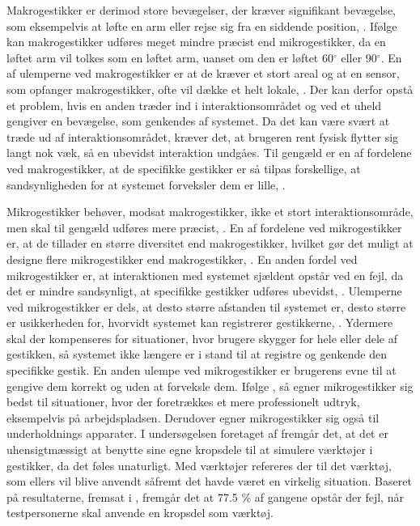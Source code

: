 Makrogestikker er derimod store bevægelser, der kræver signifikant bevægelse, som eksempelvis at løfte en arm eller rejse sig fra en siddende position, \parencite[s. 6]{PDF:UsabilityofMicroVsMacroGestures}. Ifølge \textcite[s. 9]{PDF:UsabilityofMicroVsMacroGestures} kan makrogestikker udføres meget mindre præcist end mikrogestikker, da en løftet arm vil tolkes som en løftet arm, uanset om den er løftet 60$^{\circ}$ eller 90$^{\circ}$. En af ulemperne ved makrogestikker er at de kræver et stort areal og at en sensor, som opfanger makrogestikker, ofte vil dække et helt lokale, \parencite[s. 9]{PDF:UsabilityofMicroVsMacroGestures}. Der kan derfor opstå et problem, hvis en anden træder ind i interaktionsområdet og ved et uheld gengiver en bevægelse, som genkendes af systemet. Da det kan være svært at træde ud af interaktionsområdet, kræver det, at brugeren rent fysisk flytter sig langt nok væk, så en ubevidst interaktion undgåes. Til gengæld er en af fordelene ved makrogestikker, at de specifikke gestikker er så tilpas forskellige, at sandsynligheden for at systemet forveksler dem er lille, \parencite[s. 9]{PDF:UsabilityofMicroVsMacroGestures}.  

Mikrogestikker behøver, modsat makrogestikker, ikke et stort interaktionsområde, men skal til gengæld udføres mere præcist, \parencite[s. 10]{PDF:UsabilityofMicroVsMacroGestures}. En af fordelene ved mikrogestikker er, at de tillader en større diversitet end makrogestikker, hvilket gør det muligt at designe flere mikrogestikker end makrogestikker, \parencite[s. 10]{PDF:UsabilityofMicroVsMacroGestures}. En anden fordel ved mikrogestikker er, at interaktionen med systemet sjældent opstår ved en fejl, da det er mindre sandsynligt, at specifikke gestikker udføres ubevidst, \parencite[s. 10]{PDF:UsabilityofMicroVsMacroGestures}. Ulemperne ved mikrogestikker er dels, at desto større afstanden til systemet er, desto større er usikkerheden for, hvorvidt systemet kan registrerer gestikkerne, \parencite[s. 10]{PDF:UsabilityofMicroVsMacroGestures}. Ydermere skal der kompenseres for situationer, hvor brugere skygger for hele eller dele af gestikken, så systemet ikke længere er i stand til at registre og genkende den specifikke gestik. En anden ulempe ved mikrogestikker er brugerens evne til at gengive dem korrekt og uden at forveksle dem. Ifølge \textcite[s. 10]{PDF:UsabilityofMicroVsMacroGestures}, så egner mikrogestikker sig bedst til situationer, hvor der foretrækkes et mere professionelt udtryk, eksempelvis på arbejdspladsen. Derudover egner mikrogestikker sig også til underholdnings apparater.\blankline
%
I undersøgelsen foretaget af \textcite[s. 823]{PDF:UnderstandingNaturalness} fremgår det, at det er uhensigtmæssigt at benytte sine egne kropsdele til at simulere værktøjer i gestikker, da det føles unaturligt. Med værktøjer refereres der til det værktøj, som ellers vil blive anvendt såfremt det havde været en virkelig situation. Baseret på resultaterne, fremsat i \textcite[s. 823]{PDF:UnderstandingNaturalness}, fremgår det at 77.5 \% af gangene opstår der fejl, når testpersonerne skal anvende en kropsdel som værktøj.

